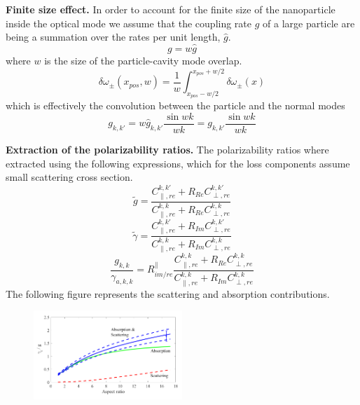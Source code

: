 \documentclass[journal=jacsat,manuscript=article]{achemso}
\begin{document}
\begin{suppinfo}
\textbf{Finite size effect.} In order to account for the finite size of the nanoparticle inside the optical mode we assume that the coupling rate $g$ of a large particle are being a summation over the rates per unit length, $\hat{g}$.
\begin{equation*}
g = w\hat{g}
\end{equation*}
where $w$ is the size of the particle-cavity mode overlap.
\begin{equation*}
\delta \omega_{\pm} \left(x_{pos}, w \right) = \frac{1}{w} \int_{x_{pos}-w/2}^{x_{pos}+w/2} \delta \omega_{\pm} \left(x \right)
\end{equation*}
which is effectively the convolution between the particle and the normal modes
\begin{equation*}
g_{k,k'} = w \hat{g}_{k,k'} \frac{\sin{wk}}{wk} = g_{k,k'} \frac{\sin{wk}}{wk}
\end{equation*}

\textbf{Extraction of the polarizability ratios.} The polarizability ratios where extracted using the following expressions, which for the loss components assume small scattering cross section.
\begin{equation*}
\tilde{g} = \frac{C_{\parallel,re}^{k,k'} + R_{Re}C_{\perp,re}^{k,k'}}{C_{\parallel,re}^{k,k} + R_{Re}C_{\perp,re}^{k,k}}
\end{equation*}
\begin{equation*}
\tilde{\gamma} = \frac{C_{\parallel,re}^{k,k'} + R_{Im}C_{\perp,re}^{k,k'}}{C_{\parallel,re}^{k,k} + R_{Im}C_{\perp,re}^{k,k}}
\end{equation*}
\begin{equation*}
\frac{g_{k,k}}{\gamma_{a,k,k}} = R^{\parallel}_{im/re} \frac{C_{\parallel,re}^{k,k} + R_{Re}C_{\perp,re}^{k,k}}{C_{\parallel,re}^{k,k} + R_{Im}C_{\perp,re}^{k,k}}
\end{equation*}
The following figure represents the scattering and absorption contributions.
\begin{figure}[H]
\centering
\includegraphics[width=0.5\textwidth]{Images/R_re_im_with_scattering.png}
\caption{}
\end{figure}

\end{suppinfo}


\end{document}
